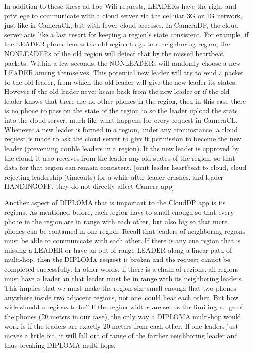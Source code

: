 In addition to these these ad-hoc Wifi requests, LEADERs have the right and privilege to communicate with a cloud server via the cellular 3G or 4G network, just like in CameraCL, but with fewer cloud accesses. In CameraDP, the cloud server acts like a last resort for keeping a region's state consistent. For example, if the LEADER phone leaves the old region to go to a neighboring region, the NONLEADERs of the old region will detect that by the missed heartbeat packets. Within a few seconds, the NONLEADERs will randomly choose a new LEADER among themselves. This potential new leader will try to send a packet to the old leader, from which the old leader will give the new leader its states. However if the old leader never hears back from the new leader or if the old leader knows that there are no other phones in the region, then in this case there is no phone to pass on the state of the region to so the leader upload the state into the cloud server, much like what happens for every request in CameraCL.  Whenever a new leader is formed in a region, under any circumstance, a cloud request is made to ask the cloud server to give it permission to become the new leader (preventing double leaders in a region). If the new leader is approved by the cloud, it also receives from the leader any old states of the region, so that data for that region can remain consistent.
[omit leader heartbeat to cloud, cloud rejecting leadership (timeouts) for a while after leader crashes, and leader HANDINGOFF, they do not directly affect Camera app]

Another aspect of DIPLOMA that is important to the CloudDP app is its regions. As mentioned before, each region have to small enough so that every phone in the region are in range with each other, but also big so that more phones can be contained in one region. Recall that leaders of neighboring regions must be able to communicate with each other. If there is any one region that is missing a LEADER or have an out-of-range LEADER along a linear path of multi-hop, then the DIPLOMA request is broken and the request cannot be completed successfully. In other words, if there is a chain of regions, all regions must have a leader an that leader must be in range with its neighboring leaders. This implies that we must make the region size small enough that two phones anywhere inside two adjacent regions, not one, could hear each other.  But how wide should a regions to be? If the region widths are set as the limiting range of the phones (20 meters in our case), the only way a DIPLOMA multi-hop would work is if the leaders are exactly 20 meters from each other. If one leaders just moves a little bit, it will fall out of range of the farther neighboring leader and thus breaking DIPLOMA multi-hops.

